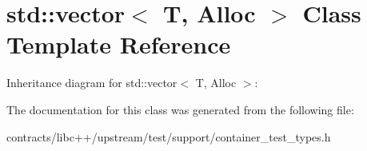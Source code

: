 \hypertarget{classstd_1_1vector}{}\section{std\+:\+:vector$<$ T, Alloc $>$ Class Template Reference}
\label{classstd_1_1vector}


Inheritance diagram for std\+:\+:vector$<$ T, Alloc $>$\+:


The documentation for this class was generated from the following file\+:\begin{DoxyCompactItemize}
\item 
contracts/libc++/upstream/test/support/container\+\_\+test\+\_\+types.\+h\end{DoxyCompactItemize}
